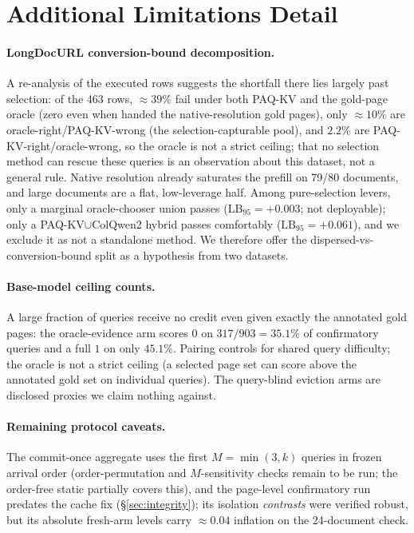 \documentclass[letterpaper]{article} %
\newcommand{\paqc}{\textsc{PAQ-KV}}
\newcommand{\lb}{\mathrm{LB}_{95}}
\begin{document}
\section{Additional Limitations Detail}\label{app:limitations-detail}
\paragraph{LongDocURL conversion-bound decomposition.} A re-analysis of the executed rows suggests the shortfall there lies largely past selection: of the 463 rows, ${\approx}39\%$ fail under both \paqc{} and the gold-page oracle (zero even when handed the native-resolution gold pages), only ${\approx}10\%$ are oracle-right/\paqc{}-wrong (the selection-capturable pool), and $2.2\%$ are \paqc{}-right/oracle-wrong, so the oracle is not a strict ceiling; that no selection method can rescue these queries is an observation about this dataset, not a general rule. Native resolution already saturates the prefill on 79/80 documents, and large documents are a flat, low-leverage half. Among pure-selection levers, only a marginal oracle-chooser union passes ($\lb=+0.003$; not deployable); only a \paqc{}${\cup}$ColQwen2 hybrid passes comfortably ($\lb=+0.061$), and we exclude it as not a standalone method. We therefore offer the dispersed-vs-conversion-bound split as a hypothesis from two datasets.

\paragraph{Base-model ceiling counts.} A large fraction of queries receive no credit even given exactly the annotated gold pages: the oracle-evidence arm scores $0$ on $317/903=35.1\%$ of confirmatory queries and a full $1$ on only $45.1\%$. Pairing controls for shared query difficulty; the oracle is not a strict ceiling (a selected page set can score above the annotated gold set on individual queries). The query-blind eviction arms are disclosed proxies we claim nothing against.

\paragraph{Remaining protocol caveats.} The commit-once aggregate uses the first $M{=}\min(3,k)$ queries in frozen arrival order (order-permutation and $M$-sensitivity checks remain to be run; the order-free static partially covers this), and the page-level confirmatory run predates the cache fix (\S\ref{sec:integrity}); its isolation \emph{contrasts} were verified robust, but its absolute fresh-arm levels carry ${\approx}0.04$ inflation on the 24-document check.
\end{document}
